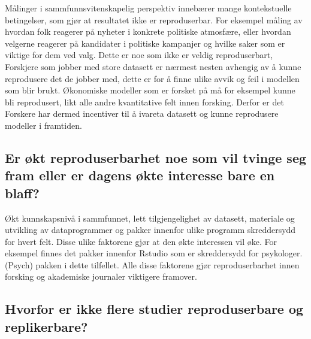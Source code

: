 \documentclass[
  norsk,
]{article}
\begin{document}
Målinger i sammfunnsvitenskapelig perspektiv innebærer mange
kontekstuelle betingelser, som gjør at resultatet ikke er reproduserbar.
For eksempel måling av hvordan folk reagerer på nyheter i konkrete
politiske atmosfære, eller hvordan velgerne reagerer på kandidater i
politiske kampanjer og hvilke saker som er viktige for dem ved valg.
Dette er noe som ikke er veldig reproduserbart, Forskjere som jobber med
store datasett er nærmest nesten avhengig av å kunne reprodusere det de
jobber med, dette er for å finne ulike avvik og feil i modellen som blir
brukt. Økonomiske modeller som er forsket på må for eksempel kunne bli
reprodusert, likt alle andre kvantitative felt innen forsking. Derfor er
det Forskere har dermed incentiver til å ivareta datasett og kunne
reprodusere modeller i framtiden.

\hypertarget{er-uxf8kt-reproduserbarhet-noe-som-vil-tvinge-seg-fram-eller-er-dagens-uxf8kte-interesse-bare-en-blaff}{%
\subsection{\texorpdfstring{\textbf{Er økt reproduserbarhet noe som vil
tvinge seg fram eller er dagens økte interesse bare en
blaff?}}{Er økt reproduserbarhet noe som vil tvinge seg fram eller er dagens økte interesse bare en blaff?}}\label{er-uxf8kt-reproduserbarhet-noe-som-vil-tvinge-seg-fram-eller-er-dagens-uxf8kte-interesse-bare-en-blaff}}

Økt kunnskapsnivå i sammfunnet, lett tilgjengelighet av datasett,
materiale og utvikling av dataprogrammer og pakker innenfor ulike
programm skreddersydd for hvert felt. Disse ulike faktorene gjør at den
økte interessen vil øke. For eksempel finnes det pakker innenfor Rstudio
som er skreddersydd for psykologer. (Psych) pakken i dette tilfellet.
Alle disse faktorene gjør reproduserbarhet innen forsking og akademiske
journaler viktigere framover.

\hypertarget{hvorfor-er-ikke-flere-studier-reproduserbare-og-replikerbare}{%
\subsection{\texorpdfstring{\textbf{Hvorfor er ikke flere studier
reproduserbare og
replikerbare?}}{Hvorfor er ikke flere studier reproduserbare og replikerbare?}}\label{hvorfor-er-ikke-flere-studier-reproduserbare-og-replikerbare}}
\end{document}
